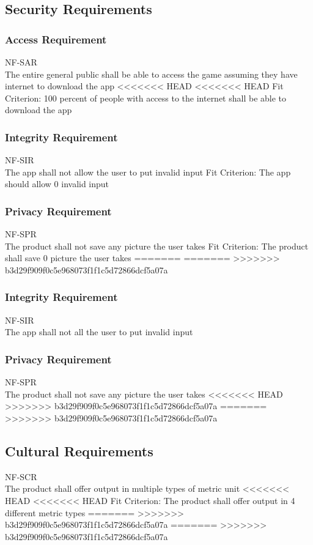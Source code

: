 \documentclass[12pt, titlepage]{article}
\begin{document}
\subsection{Security Requirements}
\subsubsection{Access Requirement}
NF-SAR \\
The entire general public shall be able to access the game assuming they have internet to download the app 
<<<<<<< HEAD
<<<<<<< HEAD
{\color{red}Fit Criterion: 100 percent of people with access to the internet shall be able to download the app}

\subsubsection{Integrity Requirement}
NF-SIR \\
The app shall not allow the user to put invalid input
{\color{red}Fit Criterion: The app should allow 0 invalid input }
\subsubsection{Privacy Requirement}
NF-SPR \\
The product shall not save any picture the user takes
{\color{red}Fit Criterion: The product shall save 0 picture the user takes}
=======
=======
>>>>>>> b3d29f909f0c5e968073f1f1c5d72866dcf5a07a

\subsubsection{Integrity Requirement}
NF-SIR \\
The app shall not all the user to put invalid input

\subsubsection{Privacy Requirement}
NF-SPR \\
The product shall not save any picture the user takes
<<<<<<< HEAD
>>>>>>> b3d29f909f0c5e968073f1f1c5d72866dcf5a07a
=======
>>>>>>> b3d29f909f0c5e968073f1f1c5d72866dcf5a07a

\subsection{Cultural Requirements}
NF-SCR \\
The product shall offer output in multiple  types of metric unit
<<<<<<< HEAD
<<<<<<< HEAD
{\color{red}Fit Criterion: The product shall offer output in 4 different metric types }
=======
>>>>>>> b3d29f909f0c5e968073f1f1c5d72866dcf5a07a
=======
>>>>>>> b3d29f909f0c5e968073f1f1c5d72866dcf5a07a
\end{document}
